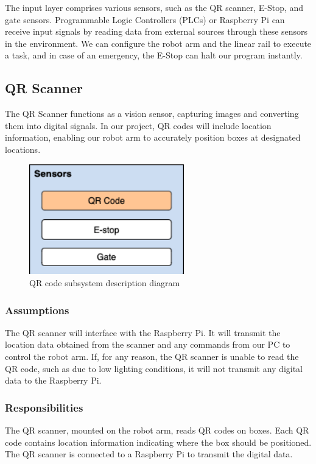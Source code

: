 The input layer comprises various sensors, such as the QR scanner, E-Stop, and gate sensors. Programmable Logic Controllers (PLCs) or Raspberry Pi can receive input signals by reading data from external sources through these sensors in the environment. We can configure the robot arm and the linear rail to execute a task, and in case of an emergency, the E-Stop can halt our program instantly.

\subsection{QR Scanner}
The QR Scanner functions as a vision sensor, capturing images and converting them into digital signals. In our project, QR codes will include location information, enabling our robot arm to accurately position boxes at designated locations.

\begin{figure}[h!]
	\centering
 	\includegraphics[width=0.60\textwidth]{images/qr.png}
 \caption{QR code subsystem description diagram}
\end{figure}

\subsubsection{Assumptions}
The QR scanner will interface with the Raspberry Pi. It will transmit the location data obtained from the scanner and any commands from our PC to control the robot arm. If, for any reason, the QR scanner is unable to read the QR code, such as due to low lighting conditions, it will not transmit any digital data to the Raspberry Pi.

\subsubsection{Responsibilities}
The QR scanner, mounted on the robot arm, reads QR codes on boxes. Each QR code contains location information indicating where the box should be positioned. The QR scanner is connected to a Raspberry Pi to transmit the digital data.

